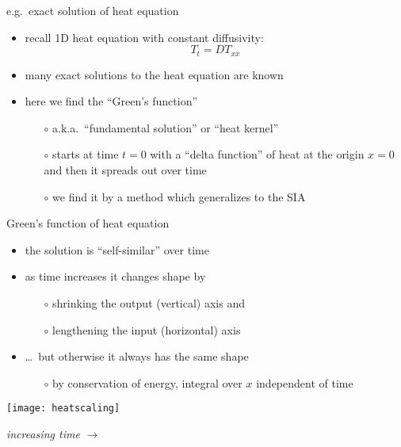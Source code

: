 \begin{frame}{e.g.~exact solution of heat equation}

\begin{itemize}
\item recall 1D heat equation with constant diffusivity:
	$$T_t = D T_{xx}$$
\item many exact solutions to the heat equation are known

\bigskip
\item here we find the ``Green's function''
  \begin{itemize}
  \item[$\circ$] a.k.a.~``fundamental solution'' or ``heat kernel''
  \item[$\circ$] starts at time $t=0$ with a ``delta function'' of heat at the origin $x=0$ and then it spreads out over time
  \item[$\circ$] we find it by a method which generalizes to the SIA
  \end{itemize}
\end{itemize}
\end{frame}


\begin{frame}{Green's function of heat equation}

\begin{itemize}
\item the solution is ``self-similar'' over time
\item as time increases it changes shape by
  \begin{itemize}
  \item[$\circ$] shrinking the output (vertical) axis and
  \item[$\circ$] lengthening the input (horizontal) axis
  \end{itemize}
\item \dots\, but otherwise it always has the same shape
  \begin{itemize}
  \item[$\circ$] by conservation of energy, integral over $x$ independent of time
  \end{itemize}
\end{itemize}

\begin{center}
\texttt{[image: heatscaling]}

\emph{increasing time} \Large $\to$
\end{center}
\end{frame}


